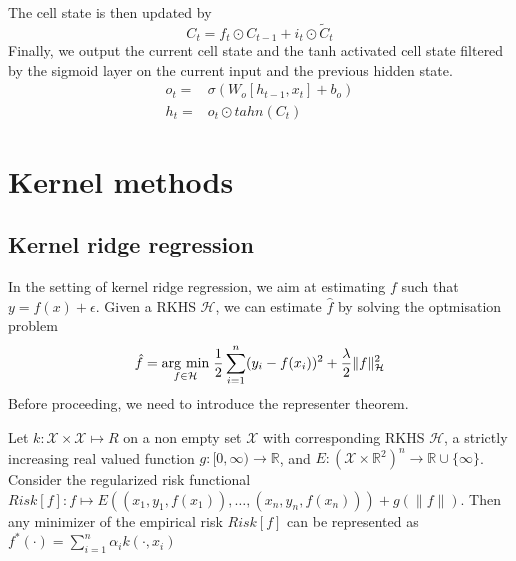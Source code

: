 The cell state is then updated by
\begin{equation}
    C_t=f_t\odot C_{t-1}+i_t\odot \tilde{C}_t
\end{equation}
Finally, we output the current cell state and the tanh activated cell state filtered by the sigmoid layer on the current input and the previous hidden state.
\begin{equation}
    \begin{aligned}
    o_t=& \sigma(W_o[h_{t-1},x_t]+b_o)
    \\
    h_t=& o_t \odot tahn(C_t)
\end{aligned}
\end{equation}


\section{Kernel methods}
\subsection{Kernel ridge regression}
In the setting of kernel ridge regression, we aim at estimating $f$ such that $y=f(x)+\epsilon$. Given a RKHS $\mathcal{H}$, we can estimate $\hat{f}$ by solving the optmisation problem
\begin{equation}\label{eq:kernel ridge}
    \hat{f}=\underset{f\in \mathcal{H}}{\operatorname{arg}\,\operatorname{min}}\;\frac{1}{2}\sum\limits_{i=1}^n(y_i-f(x_i))^2+\frac{\lambda}{2}\|f\|_{\mathcal{H}}^2
\end{equation}
Before proceeding, we need to introduce the representer theorem.
\begin{theorem}
    Let $k:\mathcal{X} \times \mathcal{X} \mapsto R$ on a non empty set $\mathcal{X}$ with corresponding RKHS $\mathcal{H}$,
    a strictly increasing real valued function $g:[0,\infty) \to \mathbb{R}$, and $E:(\mathcal{X}\times \mathbb{R}^2)^n \to \mathbb{R} \cup \{\infty\}$.
    Consider the regularized risk functional $Risk[f]:f \mapsto  E\left((x_{1},y_{1},f(x_{1})),\ldots, (x_{n},y_{n},f(x_{n}))\right)+g\left(\| f\| \right)$. Then any minimizer of the empirical risk $Risk[f]$ can be represented as $ f^{*}(\cdot )=\sum\limits_{i=1}^{n}\alpha _{i}k(\cdot ,x_{i})$
\end{theorem}

